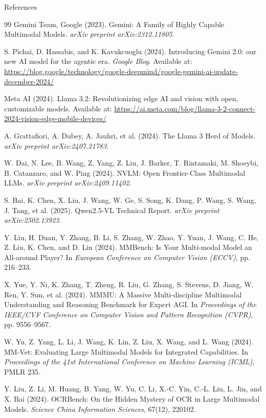 \documentclass[aspectratio=169]{beamer}
\begin{document}
\begin{frame}[allowframebreaks]{References}
\begin{thebibliography}{99}
			 Gemini Team, Google (2023). Gemini: A Family of Highly Capable Multimodal Models. \textit{arXiv preprint arXiv:2312.11805}.
			
			 S. Pichai, D. Hassabis, and K. Kavukcuoglu (2024). Introducing Gemini 2.0: our new AI model for the agentic era. \textit{Google Blog}. Available at: \url{https://blog.google/technology/google-deepmind/google-gemini-ai-update-december-2024/}
			
			 Meta AI (2024). Llama 3.2: Revolutionizing edge AI and vision with open, customizable models. Available at: \url{https://ai.meta.com/blog/llama-3-2-connect-2024-vision-edge-mobile-devices/}
			
			 A. Grattafiori, A. Dubey, A. Jauhri, et al. (2024). The Llama 3 Herd of Models. \textit{arXiv preprint arXiv:2407.21783}.
			
			 W. Dai, N. Lee, B. Wang, Z. Yang, Z. Liu, J. Barker, T. Rintamaki, M. Shoeybi, B. Catanzaro, and W. Ping (2024). NVLM: Open Frontier-Class Multimodal LLMs. \textit{arXiv preprint arXiv:2409.11402}.
			
			 S. Bai, K. Chen, X. Liu, J. Wang, W. Ge, S. Song, K. Dang, P. Wang, S. Wang, J. Tang, et al. (2025). Qwen2.5-VL Technical Report. \textit{arXiv preprint arXiv:2502.13923}.
			
			 Y. Liu, H. Duan, Y. Zhang, B. Li, S. Zhang, W. Zhao, Y. Yuan, J. Wang, C. He, Z. Liu, K. Chen, and D. Lin (2024). MMBench: Is Your Multi-modal Model an All-around Player? In \textit{European Conference on Computer Vision (ECCV)}, pp. 216--233.
			
			 X. Yue, Y. Ni, K. Zhang, T. Zheng, R. Liu, G. Zhang, S. Stevens, D. Jiang, W. Ren, Y. Sun, et al. (2024). MMMU: A Massive Multi-discipline Multimodal Understanding and Reasoning Benchmark for Expert AGI. In \textit{Proceedings of the IEEE/CVF Conference on Computer Vision and Pattern Recognition (CVPR)}, pp. 9556--9567.
			
			 W. Yu, Z. Yang, L. Li, J. Wang, K. Lin, Z. Liu, X. Wang, and L. Wang (2024). MM-Vet: Evaluating Large Multimodal Models for Integrated Capabilities. In \textit{Proceedings of the 41st International Conference on Machine Learning (ICML)}, PMLR 235.
			
			 Y. Liu, Z. Li, M. Huang, B. Yang, W. Yu, C. Li, X.-C. Yin, C.-L. Liu, L. Jin, and X. Bai (2024). OCRBench: On the Hidden Mystery of OCR in Large Multimodal Models. \textit{Science China Information Sciences}, 67(12), 220102.
			

\end{thebibliography}
\end{frame}
\end{document}

